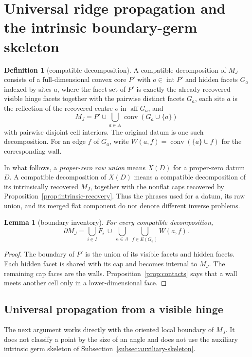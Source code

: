 \documentclass[11pt]{amsart}
\newtheorem{lemma}[theorem]{Lemma}
\theoremstyle{definition}
\newtheorem{definition}[theorem]{Definition}
\newcommand{\conv}{\operatorname{conv}}
\newcommand{\aff}{\operatorname{aff}}
\begin{document}
\section{Universal ridge propagation and the intrinsic boundary-germ skeleton}
\label{sec:skeleton}

\begin{definition}[compatible decomposition]
\label{def:compatible}
A compatible decomposition of $M_J$ consists of a full-dimensional convex
core $P'$ with $o\in\operatorname{int}P'$ and hidden facets $G_a$ indexed by
sites $a$, where the facet set of $P'$ is exactly the already recovered
visible hinge facets together with the pairwise distinct facets $G_a$, each
site $a$ is the reflection of the recovered centre $o$ in $\aff G_a$, and
\[
 M_J=P'\cup\bigcup_{a\in A}\conv(G_a\cup\{a\})
\]
with pairwise disjoint cell interiors.  The original datum is one such
decomposition.  For an edge $f$ of $G_a$, write
$W(a,f)=\conv(\{a\}\cup f)$ for the corresponding wall.
\end{definition}

In what follows, a \emph{proper-zero raw union} means $X(D)$ for a proper-zero
datum $D$.  A compatible decomposition of $X(D)$ means a compatible
decomposition of its intrinsically recovered $M_J$, together with the
nonflat caps recovered by Proposition~\ref{prop:intrinsic-recovery}.  Thus the
phrases used for a datum, its raw union, and its merged flat component do not
denote different inverse problems.

\begin{lemma}[boundary inventory]
\label{lem:inventory}
For every compatible decomposition,
\[
 \partial M_J
 =\bigcup_{i\in I}F_i\ \cup\
   \bigcup_{a\in A}\ \bigcup_{f\in E(G_a)}W(a,f).
\]
\end{lemma}

\begin{proof}
The boundary of $P'$ is the union of its visible facets and hidden facets.
Each hidden facet is shared with its cap and becomes internal to $M_J$.  The
remaining cap faces are the walls.  Proposition~\ref{prop:contacts} says that
a wall meets another cell only in a lower-dimensional face.
\end{proof}

\subsection{Universal propagation from a visible hinge}

The next argument works directly with the oriented local boundary of $M_J$.
It does not classify a point by the size of an angle and does not use the
auxiliary intrinsic germ skeleton of
Subsection~\ref{subsec:auxiliary-skeleton}.
\end{document}
